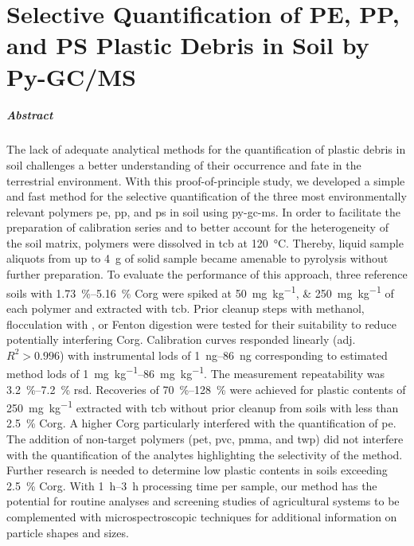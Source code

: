 
\chapter{Selective Quantification of PE, PP, and PS Plastic Debris in Soil by Py-GC/MS}
\label{ch:py-gc-ms-method}

\paragraph{Abstract} The lack of adequate analytical methods for the quantification of plastic debris in soil challenges a better understanding of their occurrence and fate in the terrestrial environment.
With this proof-of-principle study, we developed a simple and fast method for the selective quantification of the three most environmentally relevant polymers \ac{pe}, \ac{pp}, and \ac{ps} in soil using \ac{py-gc-ms}.
In order to facilitate the preparation of calibration series and to better account for the heterogeneity of the soil matrix, polymers were dissolved in \ac{tcb} at \SI{120}{\degreeCelsius}. Thereby, liquid sample aliquots from up to \SI{4}{\gram} of solid sample became amenable to pyrolysis without further preparation. To evaluate the performance of this approach, three reference soils with \SIrange{1.73}{5.16}{\percent} \ac{Corg} were spiked at \SIlist{50;250}{\milli\gram\per\kilo\gram} of each polymer and extracted with \ac{tcb}. Prior cleanup steps with methanol, flocculation with , or Fenton digestion were tested for their suitability to reduce potentially interfering \ac{Corg}.
Calibration curves responded linearly (adj. $R^2 > 0.996$) with instrumental \acp{lod} of \SIrange{1}{86}{\nano\gram} corresponding to estimated method \acp{lod} of \SIrange{1}{86}{\milli\gram\per\kilo\gram}. The measurement repeatability was \SIrange{3.2}{7.2}{\percent} \ac{rsd}. Recoveries of \SIrange{70}{128}{\percent} were achieved for plastic contents of \SI{250}{\milli\gram\per\kilo\gram} extracted with \ac{tcb} without prior cleanup from soils with less than \SI{2.5}{\percent} \ac{Corg}. A higher \ac{Corg} particularly interfered with the quantification of \ac{pe}. The addition of non-target polymers (\ac{pet}, \ac{pvc}, \ac{pmma}, and \ac{twp}) did not interfere with the quantification of the analytes highlighting the selectivity of the method. Further research is needed to determine low plastic contents in soils exceeding \SI{2.5}{\percent} \ac{Corg}. With \SIrange{1}{3}{\hour} processing time per sample, our method has the potential for routine analyses and screening studies of agricultural systems to be complemented with microspectroscopic techniques for additional information on particle shapes and sizes.

